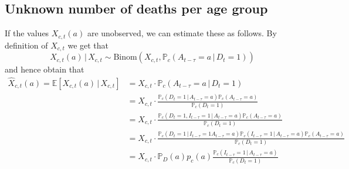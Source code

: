 \documentclass[a4paper]{article}
\renewcommand\P{\mathbb{P}}
\newcommand\E{\mathbb{E}}
\newcommand{\given}{\, \vert \,}
\begin{document}
{\subsection{Unknown number of deaths per age group}
%
If the values $X_{c,t}(a)$ are unobserved, we can estimate these as follows. By definition of $X_{c,t}$ we get that
$$X_{c,t}(a) \given X_{c,t} \sim \text{Binom}(X_{c,t}, \P_c(A_{t-\tau} = a \given D_{t} = 1))$$
and hence obtain that
\begin{align*}
\hat{X}_{c,t}(a) = \E[X_{c,t}(a) \given X_{c,t}] 	&= X_{c,t} \cdot \P_c(A_{t-\tau} = a \given D_{t} = 1) \\
																		&= X_{c,t} \cdot \frac{\P_c(D_t = 1 \given A_{t-\tau} = a) \P_c(A_{t-\tau} = a)}{\P_c(D_t = 1)} \\
																		&= X_{c,t} \cdot \frac{\P_c(D_t = 1, I_{t-\tau} = 1 \given A_{t-\tau} = a) \P_c(A_{t-\tau} = a)}{\P_c(D_t = 1)} \\
																		&= X_{c,t} \cdot \frac{\P_c(D_t = 1\given I_{t-\tau} = 1 A_{t-\tau} = a) \P_c(I_{t-\tau} = 1 \given A_{t-\tau} = a) \P_c(A_{t-\tau} = a)}{\P_c(D_t = 1)} \\
																		&= X_{c,t} \cdot \P_D(a) p_c(a) \frac{\P_c(I_{t-\tau} = 1 \given A_{t-\tau} = a) }{\P_c(D_t = 1)} \\
\end{align*}
}
\end{document}

